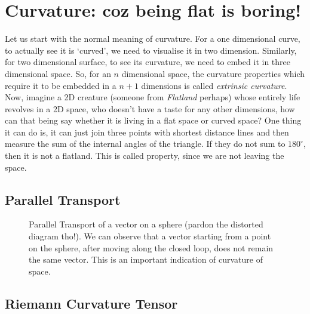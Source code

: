 \section{Curvature: coz being flat is boring!}
Let us start with the normal meaning of curvature. For a one dimensional curve, to actually see it is `curved', we need to visualise it in two dimension. Similarly, for two dimensional surface, to see its curvature, we need to embed it in three dimensional space. So, for an $n$ dimensional space, the curvature properties which require it to be embedded in a $n+1$ dimensions is called \textit{extrinsic curvature}.\\[0.3cm]
Now, imagine a 2D creature (someone from \textit{Flatland} perhaps) whose entirely life revolves in a 2D space, who doesn't have a taste for any other dimensions, how can that being say whether it is living in a flat space or curved space? One thing it can do is, it can just join three points with shortest distance lines and then measure the sum of the internal angles of the triangle. If they do not sum to $180^\circ$, then it is not a flatland. This is called  property, since we are not leaving the space.
\subsection{Parallel Transport} 
\begin{figure}[H]
    \centering 
    
    \caption{Parallel Transport of a vector on a sphere (pardon the distorted diagram tho!). We can observe that a vector starting from a point on the sphere, after moving along the closed loop, does not remain the same vector. This is an important indication of curvature of space.}
\end{figure}
\subsection{Riemann Curvature Tensor}
